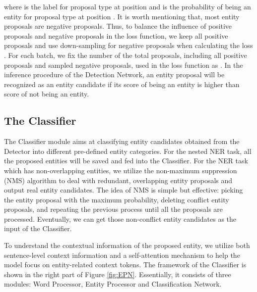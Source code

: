 \documentclass[11pt,a4paper]{article}
\begin{document}
where  is the label for proposal type  at position  and  is the probability of being an entity for proposal type  at position .
It is worth mentioning that, most entity proposals are negative proposals. Thus, 
to balance the influence of positive proposals and negative proposals in the loss function, we keep all positive proposals and use down-sampling for negative proposals when calculating the loss .  
For each batch, we fix the number of the total proposals, including all positive proposals and sampled negative proposals, used in the loss function as .
In the inference procedure of the Detection Network, an entity proposal will be recognized as an entity candidate if its score of being an entity is higher than score of not being an entity. 

\subsection{The Classifier}
The Classifier module aims at classifying entity candidates obtained from the Detector into different pre-defined entity categories. For the nested NER task, all the proposed entities will be saved and fed into the Classifier. For the NER task which has non-overlapping entities, we utilize the non-maximum suppression (NMS) algorithm \citep{neubeck2006efficient} to deal with redundant, overlapping entity proposals and output real entity candidates.
The idea of NMS is simple but effective: picking the entity proposal with the maximum probability, deleting conflict entity proposals, and repeating the previous process until all the proposals are processed. Eventually, we can get those non-conflict entity candidates as the input of the Classifier.

To understand the contextual information of the proposed entity, we utilize both sentence-level context information and a self-attention mechanism to help the model focus on entity-related context tokens. 
The framework of the Classifier is shown in the right part of Figure \ref{fig:EPN}. Essentially, it consists of three modules: Word Processor, Entity Processor and Classification Network.
\end{document}
